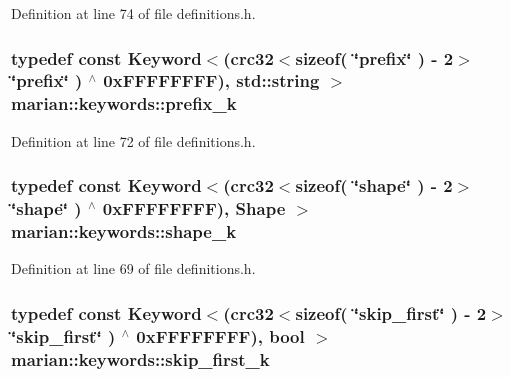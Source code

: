 Definition at line 74 of file definitions.\+h.

\subsubsection[{\texorpdfstring{prefix\+\_\+k}{prefix_k}}]{\setlength{\rightskip}{0pt plus 5cm}typedef const {\bf Keyword}$<$({\bf crc32}$<$sizeof( \char`\"{}prefix\char`\"{} ) -\/ 2$>$ \char`\"{}{\bf prefix}\char`\"{} ) $^\wedge$ 0x\+F\+F\+F\+F\+F\+F\+F\+F), std\+::string $>$ marian\+::keywords\+::prefix\+\_\+k}\hypertarget{namespacemarian_1_1keywords_a03f95871357599bf366571e00e22bd06}{}\label{namespacemarian_1_1keywords_a03f95871357599bf366571e00e22bd06}


Definition at line 72 of file definitions.\+h.

\subsubsection[{\texorpdfstring{shape\+\_\+k}{shape_k}}]{\setlength{\rightskip}{0pt plus 5cm}typedef const {\bf Keyword}$<$({\bf crc32}$<$sizeof( \char`\"{}shape\char`\"{} ) -\/ 2$>$ \char`\"{}{\bf shape}\char`\"{} ) $^\wedge$ 0x\+F\+F\+F\+F\+F\+F\+F\+F), Shape $>$ marian\+::keywords\+::shape\+\_\+k}\hypertarget{namespacemarian_1_1keywords_ac7bfe8a14a8b8ae619bab1dbc8ccdb54}{}\label{namespacemarian_1_1keywords_ac7bfe8a14a8b8ae619bab1dbc8ccdb54}


Definition at line 69 of file definitions.\+h.

\subsubsection[{\texorpdfstring{skip\+\_\+first\+\_\+k}{skip_first_k}}]{\setlength{\rightskip}{0pt plus 5cm}typedef const {\bf Keyword}$<$({\bf crc32}$<$sizeof( \char`\"{}skip\+\_\+first\char`\"{} ) -\/ 2$>$ \char`\"{}{\bf skip\+\_\+first}\char`\"{} ) $^\wedge$ 0x\+F\+F\+F\+F\+F\+F\+F\+F), bool $>$ marian\+::keywords\+::skip\+\_\+first\+\_\+k}\hypertarget{namespacemarian_1_1keywords_ad98b44f9f1590b98af7150b6b1dded7c}{}\label{namespacemarian_1_1keywords_ad98b44f9f1590b98af7150b6b1dded7c}


